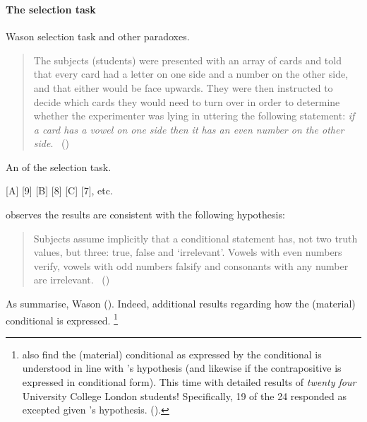 \subsubsection{}
\label{sec:illu3-1}

\paragraph{The selection task}
\nocite{Wason:1968aa}
\nocite{wason1971natural}

\begin{note}
  Wason selection task and other paradoxes.

  \begin{quote}
    The subjects (students) were presented with an array of cards and told that every card had a letter on one side and a number on the other side, and that either would be face upwards.
    They were then instructed to decide which cards they would need to turn over in order to determine whether the experimenter was lying in uttering the following statement:
    \emph{if a card has a vowel on one side then it has an even number on the other side}.%
    \mbox{ }\hfill\mbox{(\citeyear[145--146]{Wason:1966aa})}
  \end{quote}

  \begin{center}
    An  of the selection task.

    [A] [9] [B] [8] [C] [7], etc.
  \end{center}

  \citeauthor{Wason:1966aa} observes the results are consistent with the following hypothesis:
  \begin{quote}
    Subjects assume implicitly that a conditional statement has, not two truth values, but three: true, false and `irrelevant'.
    Vowels with even numbers verify, vowels with odd numbers falsify and consonants with any number are irrelevant.%
    \mbox{ }\hfill\mbox{(\citeyear[146]{Wason:1966aa})}
  \end{quote}

  As \citeauthor{Johnson-Laird:1969aa} summarise, Wason  (\citeyear[367]{Johnson-Laird:1969aa}).
  Indeed, \citeauthor{Johnson-Laird:1969aa} additional results regarding how the (material) conditional is expressed.%
  \footnote{
    \citeauthor{Johnson-Laird:1969aa} also find the (material) conditional as expressed by the conditional is understood in line with \citeauthor{Wason:1966aa}'s hypothesis (and likewise if the contrapositive is expressed in conditional form).
    This time with detailed results of \emph{twenty four} University College London students!
    Specifically, 19 of the 24 responded as excepted given \citeauthor{Wason:1966aa}'s hypothesis.
    (\citeyear[369,370]{Johnson-Laird:1969aa}).
  }
\end{note}

